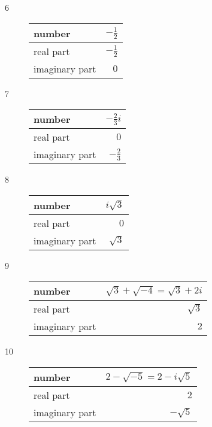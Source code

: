 \documentclass{exam}
\begin{document}
\begin{description}
    \item[6]
      \begin{tabular}{lr}
        \toprule
        number         & $- \frac{1}{2}$ \\
        \midrule
        real part      & $- \frac{1}{2}$ \\
        \midrule
        imaginary part & $0$ \\
        \bottomrule
      \end{tabular}

    \item[7]
      \begin{tabular}{lr}
        \toprule
        number         & $- \frac{2}{3} i$ \\
        \midrule
        real part      & $0$ \\
        \midrule
        imaginary part & $- \frac{2}{3}$ \\
        \bottomrule
      \end{tabular}

    \item[8]
      \begin{tabular}{lr}
        \toprule
        number         & $i \sqrt{3}$ \\
        \midrule
        real part      & $0$ \\
        \midrule
        imaginary part & $\sqrt{3}$ \\
        \bottomrule
      \end{tabular}

    \item[9]
      \begin{tabular}{lr}
        \toprule
        number         & $\sqrt{3} + \sqrt{-4} = \sqrt{3} + 2i$ \\
        \midrule
        real part      & $\sqrt{3}$ \\
        \midrule
        imaginary part & $2$ \\
        \bottomrule
      \end{tabular}

    \item[10]
      \begin{tabular}{lr}
        \toprule
        number         & $2 - \sqrt{-5} = 2 - i \sqrt{5}$ \\
        \midrule
        real part      & $2$ \\
        \midrule
        imaginary part & $-\sqrt{5}$ \\
        \bottomrule
      \end{tabular}


\end{description}
\end{document}
